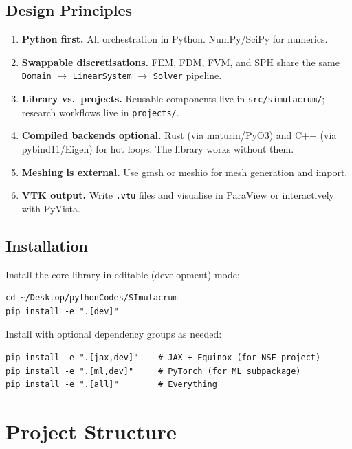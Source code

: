 \documentclass[11pt,a4paper]{report}
\begin{document}
\section{Design Principles}

\begin{enumerate}[leftmargin=2em]
    \item \textbf{Python first.} All orchestration in Python. NumPy/SciPy for numerics.
    \item \textbf{Swappable discretisations.} FEM, FDM, FVM, and SPH share the same \texttt{Domain} $\to$ \texttt{LinearSystem} $\to$ \texttt{Solver} pipeline.
    \item \textbf{Library vs.\ projects.} Reusable components live in \texttt{src/simulacrum/}; research workflows live in \texttt{projects/}.
    \item \textbf{Compiled backends optional.} Rust (via maturin/PyO3) and C++ (via pybind11/Eigen) for hot loops. The library works without them.
    \item \textbf{Meshing is external.} Use gmsh or meshio for mesh generation and import.
    \item \textbf{VTK output.} Write \texttt{.vtu} files and visualise in ParaView or interactively with PyVista.
\end{enumerate}

\section{Installation}

Install the core library in editable (development) mode:

\begin{lstlisting}[style=bash]
cd ~/Desktop/pythonCodes/SImulacrum
pip install -e ".[dev]"
\end{lstlisting}

Install with optional dependency groups as needed:

\begin{lstlisting}[style=bash]
pip install -e ".[jax,dev]"    # JAX + Equinox (for NSF project)
pip install -e ".[ml,dev]"     # PyTorch (for ML subpackage)
pip install -e ".[all]"        # Everything
\end{lstlisting}

\chapter{Project Structure}
\end{document}
